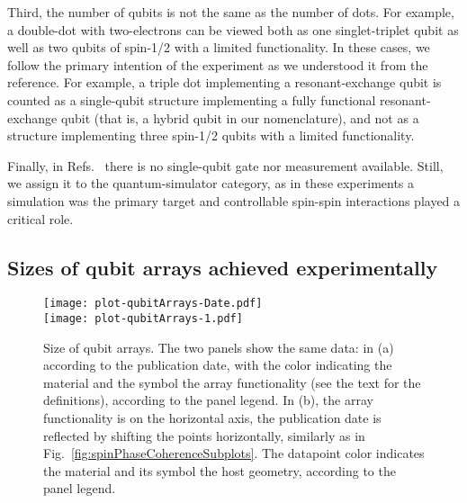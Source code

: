 \documentclass[aps, prx, showpacs, twocolumn, superscriptaddress, notitlepage, longbibliography, floatfix, nofootinbib]{revtex4-2}
\begin{document}
Third, the number of qubits is not the same as the number of dots. For example, a double-dot with two-electrons can be viewed both as one singlet-triplet qubit as well as two qubits of spin-1/2 with a limited functionality. In these cases, we follow the primary intention of the experiment as we understood it from the reference. For example, a triple dot implementing a resonant-exchange qubit is counted as a single-qubit structure implementing a fully functional resonant-exchange qubit (that is, a hybrid qubit in our nomenclature), and not as a structure implementing three spin-1/2 qubits with a limited functionality.

Finally, in Refs.~\cite{van_diepen_quantum_2021,dehollain_nagaoka_2020} there is no single-qubit gate nor measurement available. Still, we assign it to the quantum-simulator category, as in these experiments a simulation was the primary target and controllable spin-spin interactions played a critical role.

\subsection{Sizes of qubit arrays achieved experimentally}


\begin{figure}[t!]
  \texttt{[image: plot-qubitArrays-Date.pdf]}\\ 
    \texttt{[image: plot-qubitArrays-1.pdf]}
  \caption{
  \label{fig:arraySize}
  Size of qubit arrays. The two panels show the same data: in (a) according to the publication date, with the color indicating the material and the symbol the array functionality (see the text for the definitions), according to the panel legend. In (b), the array functionality is on the horizontal axis, the publication date is reflected by shifting the points horizontally, similarly as in Fig.~\ref{fig:spinPhaseCoherenceSubplots}. The datapoint color indicates the material and its symbol the host geometry, according to the panel legend.
  }
\end{figure}
\end{document}
